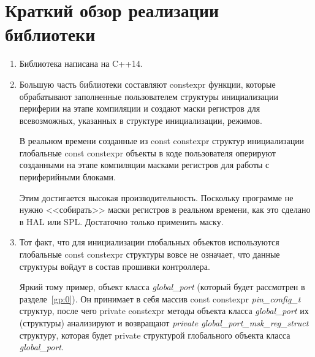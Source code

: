 \section{Краткий обзор реализации библиотеки}
\begin{enumerate}
	\item Библиотека написана на C++14. 
	\item Большую часть библиотеки составляют constexpr функции, которые обрабатывают заполненные пользователем структуры инициализации периферии на этапе компиляции и создают маски регистров для всевозможных, указанных в структуре инициализации, режимов.
	
	В реальном времени созданные из const constexpr структур инициализации глобальные const constexpr объекты в коде пользователя оперируют созданными на этапе компиляции масками регистров для работы с периферийными блоками.
	
	Этим достигается высокая производительность. Поскольку программе не нужно <<собирать>> маски регистров в реальном времени, как это сделано в HAL или SPL. Достаточно только применить маску.
	\item Тот факт, что для инициализации глобальных объектов используются глобальные const constexpr структуры вовсе не означает, что данные структуры войдут в состав прошивки контроллера.
	
	Яркий тому пример, объект класса \textit{global\_\-port} (который будет рассмотрен в разделе~\ref{gp:0}). Он принимает в себя массив const constexpr \textit{pin\_config\_t} структур, после чего private constexpr методы объекта класса \textit{global\_\-port} их (структуры) анализируют и возвращают \textit{private global\_\-port\_\-msk\_\-reg\_\-struct} структуру, которая будет private структурой глобального объекта класса \textit{global\_\-port}.
	

\end{enumerate}
